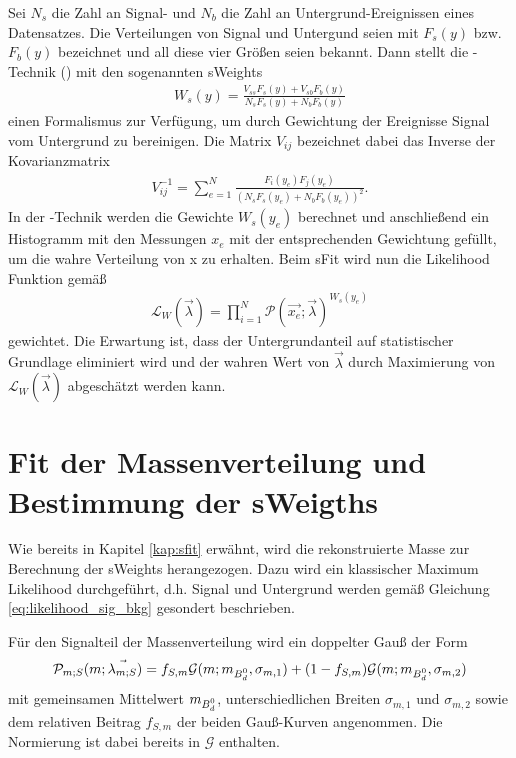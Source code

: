 Sei $N_s$ die Zahl an Signal- und $N_b$ die Zahl an Untergrund-Ereignissen eines Datensatzes. Die Verteilungen von Signal und Untergund seien mit $F_s(y)$ bzw. $F_b(y)$ bezeichnet und all diese vier Größen seien bekannt. Dann stellt die \SPlot-Technik (\cite{splot}) mit den sogenannten \glqq sWeights\grqq 
\begin{align}
W_s(y) = \frac{V_{ss}F_s(y)+V_{sb}F_b(y)}{N_sF_s(y)+N_bF_b(y)}
\end{align} 
einen Formalismus zur Verfügung, um durch Gewichtung der Ereignisse Signal vom Untergrund zu bereinigen. Die Matrix $V_{ij}$ bezeichnet dabei das Inverse der Kovarianzmatrix
\begin{align}
V_{ij}^{-1} = \sum_{e=1}^N \frac{F_i(y_e)F_j(y_e)}{(N_sF_s(y_e)+N_bF_b(y_e))^2}.
\end{align}
In der \SPlot-Technik werden die Gewichte $W_s(y_e)$ berechnet und anschließend ein Histogramm mit den Messungen $x_e$ mit der entsprechenden Gewichtung gefüllt, um die wahre Verteilung von x zu erhalten. Beim sFit wird nun die Likelihood Funktion gemäß
\begin{align}
\mathcal{L}_W(\vec{\lambda}) = \prod_{i=1}^N \mathcal{P}(\vec{x_e};\vec{\lambda})^{W_s(y_e)}
\end{align}
gewichtet. Die Erwartung ist, dass der Untergrundanteil auf statistischer Grundlage eliminiert wird und der wahren Wert von $\vec{\lambda}$ durch Maximierung von $\mathcal{L}_W(\vec{\lambda})$ abgeschätzt werden kann.

\section{Fit der Massenverteilung und Bestimmung der sWeigths}
Wie bereits in Kapitel \ref{kap:sfit} erwähnt, wird die rekonstruierte Masse zur Berechnung der sWeights herangezogen. Dazu wird ein klassischer Maximum Likelihood durchgeführt, d.h. Signal und Untergrund werden gemäß Gleichung \ref{eq:likelihood_sig_bkg} gesondert beschrieben.

Für den Signalteil der Massenverteilung wird ein doppelter Gauß der Form
\begin{align}
\mathcal{P}_{m;S}(m;\vec{\lambda_{m;S}}) = f_{S,m}\mathcal{G}(m;m_{\text{$B_d^0$}},\sigma_{m,1}) + (1-f_{S,m})\mathcal{G}(m;m_{\text{$B_d^0$}},\sigma_{m,2})
\end{align}
mit gemeinsamen Mittelwert $m_{\text{$B_d^0$}}$, unterschiedlichen Breiten $\sigma_{m,1}$ und $\sigma_{m,2}$ sowie dem relativen Beitrag $f_{S,m}$ der beiden Gauß-Kurven angenommen. Die Normierung ist dabei bereits in $\mathcal{G}$ enthalten.

